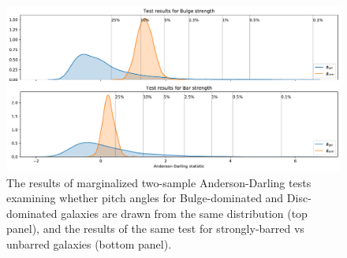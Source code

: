\begin{figure}
  \includegraphics[width=17.7cm]{plots/bulge_bar_test_results.pdf}
  \caption{The results of marginalized two-sample Anderson-Darling tests examining whether pitch angles for Bulge-dominated and Disc-dominated galaxies are drawn from the same distribution (top panel), and the results of the same test for strongly-barred vs unbarred galaxies (bottom panel).}
  \label{fig:ad-morphology-test}
\end{figure}
